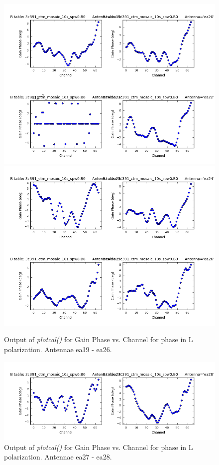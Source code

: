 \documentclass[12pt, a4paper]{article}
\begin{document}
\begin{figure}[h!]
\centering
\includegraphics[scale=0.65]{../Imaging/plots2/part4-subE-question3b_phase_pol-L-ea19-ea22.png}
\includegraphics[scale=0.65]{../Imaging/plots2/part4-subE-question3b_phase_pol-L-ea23-ea26.png}
\caption{Output of \emph{plotcal()} for Gain Phase vs. Channel for phase in L polarization. Antennae ea19 - ea26.}
\end{figure}
\addtocounter{figure}{-1}

\begin{figure}[h!]
\centering
\includegraphics[scale=0.65]{../Imaging/plots2/part4-subE-question3b_phase_pol-L-ea27-ea28.png}
\caption{Output of \emph{plotcal()} for Gain Phase vs. Channel for phase in L polarization. Antennae ea27 - ea28. \label{fig:part4subE-q3b-phase-L}}
\end{figure}
\end{document}

